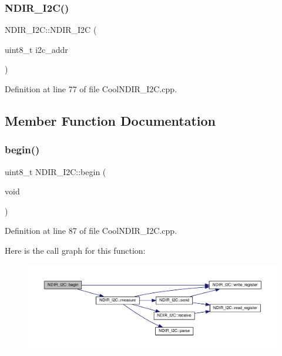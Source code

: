 \subsubsection{\texorpdfstring{N\+D\+I\+R\+\_\+\+I2\+C()}{NDIR\_I2C()}}
{\footnotesize\ttfamily N\+D\+I\+R\+\_\+\+I2\+C\+::\+N\+D\+I\+R\+\_\+\+I2C (\begin{DoxyParamCaption}\item[{uint8\+\_\+t}]{i2c\+\_\+addr }\end{DoxyParamCaption})}



Definition at line 77 of file Cool\+N\+D\+I\+R\+\_\+\+I2\+C.\+cpp.



\subsection{Member Function Documentation}
\mbox{\label{class_n_d_i_r___i2_c_acf82f3dcb41e75709a93f8b68d087a3c}} 
\subsubsection{\texorpdfstring{begin()}{begin()}}
{\footnotesize\ttfamily uint8\+\_\+t N\+D\+I\+R\+\_\+\+I2\+C\+::begin (\begin{DoxyParamCaption}\item[{void}]{ }\end{DoxyParamCaption})}



Definition at line 87 of file Cool\+N\+D\+I\+R\+\_\+\+I2\+C.\+cpp.

Here is the call graph for this function\+:\nopagebreak
\begin{figure}[H]
\begin{center}
\leavevmode
\includegraphics[width=350pt]{class_n_d_i_r___i2_c_acf82f3dcb41e75709a93f8b68d087a3c_cgraph}
\end{center}
\end{figure}
\mbox{\label{class_n_d_i_r___i2_c_ab8f50d38501d498b802b822bd4844ede}} 

